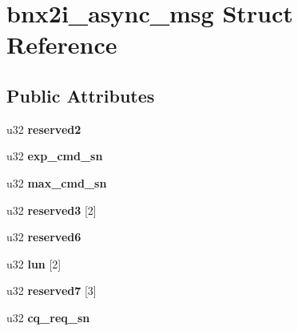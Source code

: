 \hypertarget{structbnx2i__async__msg}{
\section{bnx2i\_\-async\_\-msg Struct Reference}
\label{structbnx2i__async__msg}
}
\subsection*{Public Attributes}
\begin{DoxyCompactItemize}
\item 
\hypertarget{structbnx2i__async__msg_a7a0117328d63029828b74688c1093472}{
u32 {\bfseries reserved2}}
\label{structbnx2i__async__msg_a7a0117328d63029828b74688c1093472}

\item 
\hypertarget{structbnx2i__async__msg_a2eabbdc1bc6c98391a286a91cf60c8c9}{
u32 {\bfseries exp\_\-cmd\_\-sn}}
\label{structbnx2i__async__msg_a2eabbdc1bc6c98391a286a91cf60c8c9}

\item 
\hypertarget{structbnx2i__async__msg_ad06992b3c76ad769bdeb76252cbc8b18}{
u32 {\bfseries max\_\-cmd\_\-sn}}
\label{structbnx2i__async__msg_ad06992b3c76ad769bdeb76252cbc8b18}

\item 
\hypertarget{structbnx2i__async__msg_a4b9ceb7343b896d06122af55a3d930d6}{
u32 {\bfseries reserved3} \mbox{[}2\mbox{]}}
\label{structbnx2i__async__msg_a4b9ceb7343b896d06122af55a3d930d6}

\item 
\hypertarget{structbnx2i__async__msg_a38e0fa62709726b3c4d0d6ac63ee3a29}{
u32 {\bfseries reserved6}}
\label{structbnx2i__async__msg_a38e0fa62709726b3c4d0d6ac63ee3a29}

\item 
\hypertarget{structbnx2i__async__msg_af2785b8062aff3c206221e18cfb1914d}{
u32 {\bfseries lun} \mbox{[}2\mbox{]}}
\label{structbnx2i__async__msg_af2785b8062aff3c206221e18cfb1914d}

\item 
\hypertarget{structbnx2i__async__msg_a4a11746f601f522fa28f9dbbfd9d1355}{
u32 {\bfseries reserved7} \mbox{[}3\mbox{]}}
\label{structbnx2i__async__msg_a4a11746f601f522fa28f9dbbfd9d1355}

\item 
\hypertarget{structbnx2i__async__msg_a8a2c227ed7fa0df5460e5d0ed59c704a}{
u32 {\bfseries cq\_\-req\_\-sn}}
\label{structbnx2i__async__msg_a8a2c227ed7fa0df5460e5d0ed59c704a}

\end{DoxyCompactItemize}


